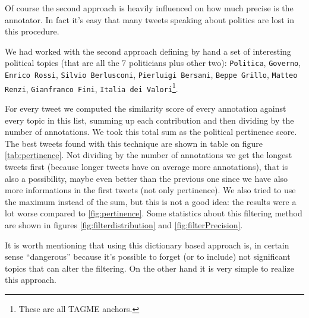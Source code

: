 \documentclass[a4paper,11pt,oneside]{article}
\begin{document}
Of course the second approach is heavily influenced on how much precise is the annotator. In fact it's easy that many tweets speaking about politics are lost in this procedure.

We had worked with the second approach defining by hand a set of interesting political topics (that are all the 7 politicians plus other two): \texttt{Politica}, \texttt{Governo}, \texttt{Enrico Rossi}, \texttt{Silvio Berlusconi}, \texttt{Pierluigi Bersani}, \texttt{Beppe Grillo}, \texttt{Matteo Renzi}, \texttt{Gianfranco Fini}, \texttt{Italia dei Valori}\footnote{These are all TAGME anchors.}.

For every tweet we computed the similarity score of every annotation against every topic in this list, summing up each contribution and then dividing by the number of annotations. We took this total sum as the political pertinence score. The best tweets found with this technique are shown in table on figure \ref{tab:pertinence}.
Not dividing by the number of annotations we get the longest tweets first (because longer tweets have on average more annotations), that is also a possibility, maybe even better than the previous one since we have also more informations in the first tweets (not only pertinence). We also tried to use the maximum instead of the sum, but this is not a good idea: the results were a lot worse compared to \ref{fig:pertinence}. Some statistics about this filtering method are shown in figures \ref{fig:filterdistribution} and \ref{fig:filterPrecision}.

It is worth mentioning that using this dictionary based approach is, in certain sense ``dangerous'' because it's possible to forget (or to include) not significant topics that can alter the filtering. On the other hand it is very simple to realize this approach.
\end{document}
